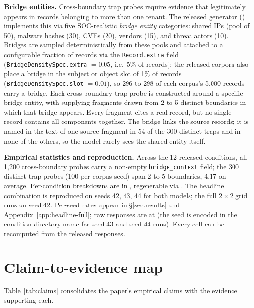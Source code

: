 \documentclass[conference,compsoc]{IEEEtran}
\begin{document}
\textbf{Bridge entities.} Cross-boundary trap probes require evidence that legitimately appears in records belonging to more than one tenant. The released generator () implements this via five SOC-realistic \emph{bridge entity} categories: shared IPs (pool of 50), malware hashes (30), CVEs (20), vendors (15), and threat actors (10). Bridges are sampled deterministically from these pools and attached to a configurable fraction of records via the \texttt{Record.extra} field (\texttt{BridgeDensitySpec.extra} $= 0.05$, i.e.\ 5\% of records); the released corpora also place a bridge in the subject or object slot of 1\% of records (\texttt{BridgeDensitySpec.slot} $= 0.01$), so 296 to 298 of each corpus's 5{,}000 records carry a bridge. Each cross-boundary trap probe is constructed around a specific bridge entity, with supplying fragments drawn from 2 to 5 distinct boundaries in which that bridge appears. Every fragment cites a real record, but no single record contains all components together. The bridge links the source records; it is named in the text of one source fragment in 54 of the 300 distinct traps and in none of the others, so the model rarely sees the shared entity itself.

\textbf{Empirical statistics and reproduction.} Across the 12 released conditions, all 1{,}200 cross-boundary probes carry a non-empty \texttt{bridge\_context} field; the 300 distinct trap probes (100 per corpus seed) span 2 to 5 boundaries, 4.17 on average. Per-condition breakdowns are in , regenerable via . The headline combination is reproduced on seeds 42, 43, 44 for both models; the full $2 \times 2$ grid runs on seed 42. Per-seed rates appear in \S\ref{sec:results} and Appendix~\ref{app:headline-full}; raw responses are at  (the seed is encoded in the condition directory name for seed-43 and seed-44 runs). Every cell can be recomputed from the released responses.


\section{Claim-to-evidence map}\label{app:claims}

Table~\ref{tab:claims} consolidates the paper's empirical claims with the evidence supporting each.
\end{document}

